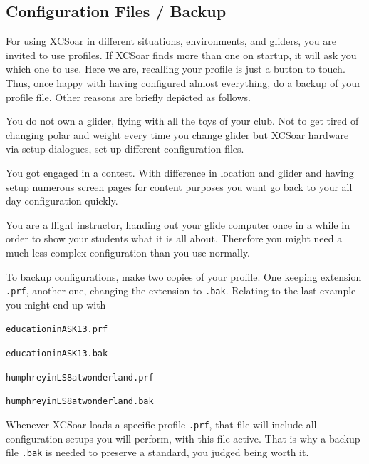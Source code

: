 \documentclass[english,a4paper,12pt]{refrep}
\begin{document}
\subsection{\textcolor{flashblue}{Configuration Files / Backup}}
For using XCSoar in different situations, environments, and gliders, you are 
invited to use profiles. If XCSoar finds more than one on startup, 
it will ask you which one to use. Here we are, recalling your profile is just a 
button to touch.
Thus, once happy with having configured almost everything, do a backup of your 
profile file. Other reasons are briefly depicted as follows.
\begin{compactitem}
\item You do not own a glider, flying with all the toys of your club. Not to 
get tired of changing polar and weight every time you change glider but XCSoar 
hardware via setup dialogues, set up different configuration files.
\item You got engaged in a contest. With difference in location and glider and 
having setup numerous screen pages for content purposes you want go back to 
your all day configuration quickly.
\item You are a flight instructor, handing out your glide computer once in a 
while in order to show your students what it is all about. Therefore you might 
need a much less complex configuration than you use normally.
\end{compactitem}
To backup configurations, make two copies of your profile.  One 
keeping extension \verb+.prf+, another one, changing the extension to
\verb+.bak+. Relating to the last example you might end up with
\begin{compactitem}
\item\verb+educationinASK13.prf+
\item\verb+educationinASK13.bak+
\item\verb+humphreyinLS8atwonderland.prf+
\item\verb+humphreyinLS8atwonderland.bak+
\end{compactitem}
Whenever XCSoar loads a specific profile \verb+.prf+, that file 
will include all configuration setups you will perform, with this file active. 
That is why a backup-file \verb+.bak+ is needed to preserve a standard, you 
judged being worth it.
\end{document}
